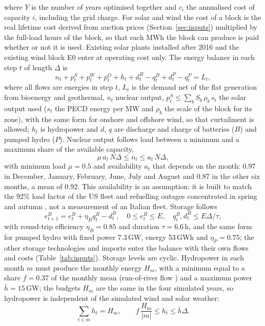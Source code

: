 where $Y$ is the number of years optimised together and $c_i$ the annualised cost of capacity $i$, including the grid charge. For solar and wind the cost of a block is the real lifetime cost derived from auction prices (Section~\ref{sec:inputs}) multiplied by the full-load hours of the block, so that each MWh the block can produce is paid whether or not it is used. Existing solar plants installed after 2016 and the existing wind block E0 enter at operating cost only. The energy balance in each step $t$ of length $\Delta$ is
\begin{equation}
n_t + p^S_t + p^W_t + p^O_t + h_t + d^B_t - q^B_t + d^P_t - q^P_t = L_t ,
\end{equation}
where all flows are energies in step $t$, $L_t$ is the demand net of the flat generation from bioenergy and geothermal, $n_t$ nuclear output, $p^S_t \le \sum_b S_b\,\rho_b\,s_t$ the solar output used ($s_t$ the PECD energy per MW and $\rho_b$ the scale of the block for its zone), with the same form for onshore and offshore wind, so that curtailment is allowed; $h_t$ is hydropower and $d$, $q$ are discharge and charge of batteries ($B$) and pumped hydro ($P$). Nuclear output follows load between a minimum and a maximum share of the available capacity,
\begin{equation}
\mu\,a_t\,N\Delta \le n_t \le a_t\,N\Delta ,
\end{equation}
with minimum load $\mu=0.5$ and availability $a_t$ that depends on the month: 0.97 in December, January, February, June, July and August and 0.87 in the other six months, a mean of 0.92. This availability is an assumption: it is built to match the 92\% load factor of the US fleet \citep{EIA2025} and refuelling outages concentrated in spring and autumn \citep{EIA2023}, not a measurement of an Italian fleet. Storage follows
\begin{equation}
e^B_{t+1} = e^B_t + \eta_B q^B_t - d^B_t,\quad 0\le e^B_t \le E,\quad q^B_t, d^B_t \le E\Delta/\tau ,
\end{equation}
with round-trip efficiency $\eta_B=0.85$ and duration $\tau=6.6$\,h, and the same form for pumped hydro with fixed power 7.3\,GW, energy 53\,GWh and $\eta_P=0.75$; the other storage technologies and imports enter the balance with their own flows and costs (Table~\ref{tab:inputs}). Storage levels are cyclic. Hydropower in each month $m$ must produce the monthly energy $H_m$, with a minimum equal to a share $f=0.37$ of the monthly mean (run-of-river flow \citep{TernaHydro}) and a maximum power $\bar h=15$\,GW; the budgets $H_m$ are the same in the four simulated years, so hydropower is independent of the simulated wind and solar weather:
\begin{equation}
\sum_{t\in m} h_t = H_m,\qquad f\,\frac{H_m}{|m|}\le h_t \le \bar{h}\Delta .
\end{equation}

